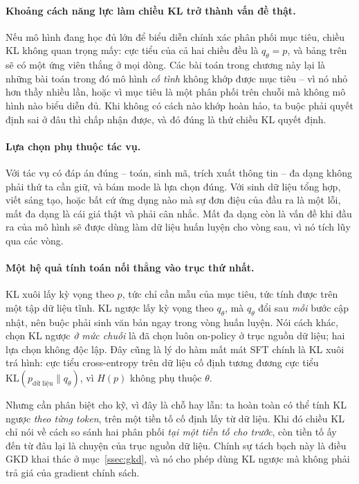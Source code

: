 \paragraph{Khoảng cách năng lực làm chiều KL trở thành vấn đề thật.} Nếu mô hình đang học đủ lớn để biểu diễn chính xác phân phối mục tiêu, chiều KL không quan trọng mấy: cực tiểu của cả hai chiều đều là $q_\theta = p$, và bảng trên sẽ có một ứng viên thắng ở mọi dòng. Các bài toán trong chương này lại là những bài toán trong đó mô hình \emph{cố tình} không khớp được mục tiêu -- vì nó nhỏ hơn thầy nhiều lần, hoặc vì mục tiêu là một phân phối trên chuỗi mà không mô hình nào biểu diễn đủ. Khi không có cách nào khớp hoàn hảo, ta buộc phải quyết định sai ở đâu thì chấp nhận được, và đó đúng là thứ chiều KL quyết định.

\paragraph{Lựa chọn phụ thuộc tác vụ.} Với tác vụ có đáp án đúng -- toán, sinh mã, trích xuất thông tin -- đa dạng không phải thứ ta cần giữ, và bám mode là lựa chọn đúng. Với sinh dữ liệu tổng hợp, viết sáng tạo, hoặc bất cứ ứng dụng nào mà sự đơn điệu của đầu ra là một lỗi, mất đa dạng là cái giá thật và phải cân nhắc. Mất đa dạng còn là vấn đề khi đầu ra của mô hình sẽ được dùng làm dữ liệu huấn luyện cho vòng sau, vì nó tích lũy qua các vòng.

\paragraph{Một hệ quả tính toán nối thẳng vào trục thứ nhất.} KL xuôi lấy kỳ vọng theo $p$, tức chỉ cần mẫu của mục tiêu, tức tính được trên một tập dữ liệu tĩnh. KL ngược lấy kỳ vọng theo $q_\theta$, mà $q_\theta$ đổi sau \emph{mỗi} bước cập nhật, nên buộc phải sinh văn bản ngay trong vòng huấn luyện. Nói cách khác, chọn KL ngược \emph{ở mức chuỗi} là đã chọn luôn on-policy ở trục nguồn dữ liệu; hai lựa chọn không độc lập. Đây cũng là lý do hàm mất mát SFT chính là KL xuôi trá hình: cực tiểu cross-entropy trên dữ liệu cố định tương đương cực tiểu $\mathrm{KL}(p_{\text{dữ liệu}} \| q_\theta)$, vì $H(p)$ không phụ thuộc $\theta$.

Nhưng cần phân biệt cho kỹ, vì đây là chỗ hay lẫn: ta hoàn toàn có thể tính KL ngược \emph{theo từng token}, trên một tiền tố cố định lấy từ dữ liệu. Khi đó chiều KL chỉ nói về cách so sánh hai phân phối \emph{tại một tiền tố cho trước}, còn tiền tố ấy đến từ đâu lại là chuyện của trục nguồn dữ liệu. Chính sự tách bạch này là điều GKD khai thác ở mục~\ref{ssec:gkd}, và nó cho phép dùng KL ngược mà không phải trả giá của gradient chính sách.

